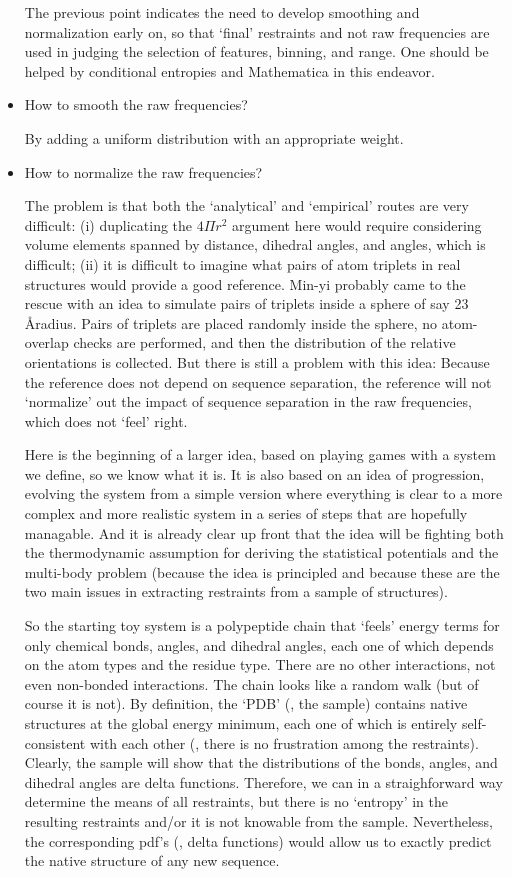\begin{itemize}
The previous point indicates the need to develop smoothing and normalization
early on, so that `final' restraints and not raw frequencies are used in judging
the selection of features, binning, and range. One should be helped by conditional
entropies and Mathematica in this endeavor.

\item How to smooth the raw frequencies?

By adding a uniform distribution with an appropriate weight.

\item How to normalize the raw frequencies?

The problem is that both the `analytical' and `empirical' routes are very difficult:
(i) duplicating the $4 \Pi r^2$ argument here would require considering volume elements 
spanned by distance, dihedral angles, and angles, which is difficult; (ii) it is 
difficult to imagine what pairs of atom triplets in real structures would provide
a good reference. Min-yi probably came to the rescue with an idea to simulate
pairs of triplets inside a sphere of say 23 \AA radius. Pairs of triplets are placed
randomly inside the sphere, no atom-overlap checks are performed, and then the
distribution of the relative orientations is collected. But there is still a problem
with this idea: Because the reference does not depend on sequence separation, the
reference will not `normalize' out the impact of sequence separation in the raw
frequencies, which does not `feel' right.

Here is the beginning of a larger idea, based on playing games with a system we define,
so we know what it is. It is also based on an idea of progression, evolving the system
from a simple version where everything is clear to a more complex and more realistic
system in a series of steps that are hopefully managable. And it is already clear
up front that the idea will be fighting both the thermodynamic assumption for deriving
the statistical potentials and the multi-body problem (because the idea is 
principled and because these are the two main issues in extracting restraints from 
a sample of structures).

So the starting toy system is a polypeptide chain that `feels' energy terms for only
chemical bonds, angles, and dihedral angles, each one of which depends on the atom types and 
the residue type. There are no other interactions, not even non-bonded 
interactions. The chain looks like a random walk (but of course it is 
not). By definition, the `PDB' (\ie, the sample) contains native structures at 
the global energy minimum, each one of which is entirely self-consistent with each other 
(\ie, there is no frustration among the restraints). Clearly, the sample will show that 
the distributions of the bonds, angles, and dihedral angles are delta functions. Therefore, 
we can in a straighforward way determine the means of all restraints, but there is no 
`entropy' in the resulting restraints and/or it is not knowable from the sample. Nevertheless, 
the corresponding pdf's (\ie, delta functions) would allow us to exactly predict the native 
structure of any new sequence.


\end{itemize}
